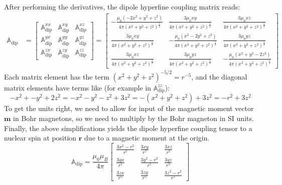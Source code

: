 \documentclass[12pt]{article}
\begin{document}
After performing the derivatives, the dipole hyperfine coupling matrix reads:
\begin{align}
\mathbb{A}_\mathrm{dip} &=
\begin{bmatrix}
\mathbb{A}_\mathrm{dip}^{xx} & \mathbb{A}_\mathrm{dip}^{xy} & \mathbb{A}_\mathrm{dip}^{xz}\\
\mathbb{A}_\mathrm{dip}^{yx} & \mathbb{A}_\mathrm{dip}^{yy} & \mathbb{A}_\mathrm{dip}^{yz}\\
\mathbb{A}_\mathrm{dip}^{zx} & \mathbb{A}_\mathrm{dip}^{zy} & \mathbb{A}_\mathrm{dip}^{zz}
\end{bmatrix} = 
\begin{bmatrix}
- \frac{\mu_{0} \left(- 2 x^{2} + y^{2} + z^{2}\right)}{4 \pi \left(x^{2} + y^{2} + z^{2}\right)^{\frac{5}{2}}} & \frac{3 \mu_{0} x y}{4 \pi \left(x^{2} + y^{2} + z^{2}\right)^{\frac{5}{2}}} & \frac{3 \mu_{0} x z}{4 \pi \left(x^{2} + y^{2} + z^{2}\right)^{\frac{5}{2}}}\\\frac{3 \mu_{0} x y}{4 \pi \left(x^{2} + y^{2} + z^{2}\right)^{\frac{5}{2}}} & - \frac{\mu_{0} \left(x^{2} - 2 y^{2} + z^{2}\right)}{4 \pi \left(x^{2} + y^{2} + z^{2}\right)^{\frac{5}{2}}} & \frac{3 \mu_{0} y z}{4 \pi \left(x^{2} + y^{2} + z^{2}\right)^{\frac{5}{2}}}\\\frac{3 \mu_{0} x z}{4 \pi \left(x^{2} + y^{2} + z^{2}\right)^{\frac{5}{2}}} & \frac{3 \mu_{0} y z}{4 \pi \left(x^{2} + y^{2} + z^{2}\right)^{\frac{5}{2}}} & - \frac{\mu_{0} \left(x^{2} + y^{2} - 2 z^{2}\right)}{4 \pi \left(x^{2} + y^{2} + z^{2}\right)^{\frac{5}{2}}}
\end{bmatrix}
\end{align}
Each matrix element has the term $(x^2 + y^2 + z^2)^{-5/2} = r^{-5}$, and the diagonal matrix elements have terms like (for example in $\mathbb{A}_\mathrm{dip}^{zz}$): 
\begin{equation}
-x^2 + -y^2 + 2z^2 = -x^2 - y^2 - z^2 + 3z^2 = -(x^2 + y^2 + z^2) + 3z^2 = -r^2 + 3z^2
\end{equation}
To get the units right, we need to allow for input of the magnetic moment vector $\mathbf{m}$ in Bohr magnetons, so we need to multiply by the Bohr magneton in SI units. Finally, the above simplifications yields the dipole hyperfine coupling tensor to a nuclear spin at position $\mathbf{r}$ due to a magnetic moment at the origin. 
\begin{equation}
\label{eqn:A_dip_final}
	\mathbb{A}_\mathrm{dip} = \frac{\mu_0 \mu_B}{4 \pi}
	\begin{bmatrix} 
		\frac{3x^2 - r^2}{r^5} & \frac{3xy}{r^5}        & \frac{3xz}{r^5}        \\ 
		\frac{3yx}{r^5}        & \frac{3y^2 - r^2}{r^5} & \frac{3yz}{r^5}        \\ 
		\frac{3zx}{r^5}        & \frac{3zy}{r^5}        & \frac{3z^2 - r^2}{r^5}
	\end{bmatrix}
\end{equation}
\end{document}
